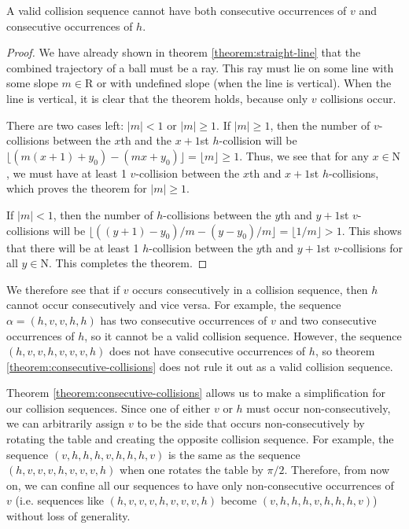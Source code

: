 \begin{theorem}
  \label{theorem:consecutive-collisions}
  A valid collision sequence cannot have both consecutive occurrences of $v$ and consecutive occurrences of $h$.
\end{theorem}
\begin{proof}
  We have already shown in theorem \ref{theorem:straight-line} that the combined trajectory of a ball must be a ray. This ray must lie on some line with some slope $m \in \mathrm{R}$ or with undefined slope (when the line is vertical). When the line is vertical, it is clear that the theorem holds, because only $v$ collisions occur. 

  There are two cases left: $|m| < 1$ or $|m| \geq 1$. If $|m| \geq 1$, then the number of $v$-collisions between the $x$th and the $x+1$st $h$-collision will be $\lfloor (m(x+1) + y_0) - (mx + y_0) \rfloor = \lfloor m \rfloor \geq 1$. Thus, we see that for any $x \in \mathrm{N}$, we must have at least 1 $v$-collision between the $x$th and $x+1$st $h$-collisions, which proves the theorem for $|m| \geq 1$.

  If $|m| < 1$, then the number of $h$-collisions between the $y$th and $y+1$st $v$-collisions will be $\lfloor ((y + 1) - y_0)/m - (y - y_0)/m \rfloor = \lfloor 1/m \rfloor > 1$. This shows that there will be at least 1 $h$-collision between the $y$th and $y+1$st $v$-collisions for all $y \in \mathrm{N}$. This completes the theorem.
\end{proof}

We therefore see that if $v$ occurs consecutively in a collision sequence, then $h$ cannot occur consecutively and vice versa. For example, the sequence $\alpha = (h, v, v, h, h)$ has two consecutive occurrences of $v$ and two consecutive occurrences of $h$, so it cannot be a valid collision sequence. However, the sequence $(h, v, v, h, v, v, v, h)$ does not have consecutive occurrences of $h$, so theorem \ref{theorem:consecutive-collisions} does not rule it out as a valid collision sequence.

Theorem \ref{theorem:consecutive-collisions} allows us to make a simplification for our collision sequences. Since one of either $v$ or $h$ must occur non-consecutively, we can arbitrarily assign $v$ to be the side that occurs non-consecutively by rotating the table and creating the opposite collision sequence. For example, the sequence $(v, h, h, h, v, h, h, h, v)$ is the same as the sequence $(h, v, v, v, h, v, v, v, h)$ when one rotates the table by $\pi/2$. Therefore, from now on, we can confine all our sequences to have only non-consecutive occurrences of $v$ (i.e. sequences like $(h, v, v, v, h, v, v, v, h)$ become $(v, h, h, h, v, h, h, h, v)$) without loss of generality.
